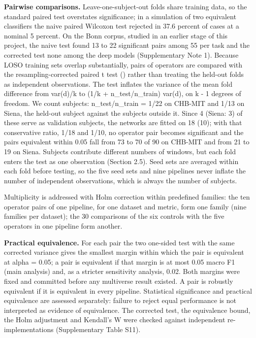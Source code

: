 \documentclass[11pt,a4paper]{article}
\newcounter{none} %
\begin{document}
\textbf{Pairwise comparisons.} Leave-one-subject-out folds share training data, so the
standard paired test overstates significance; in a simulation of two equivalent
classifiers the naive paired Wilcoxon test rejected in 37.6 percent of cases at a
nominal 5 percent. On the Bonn corpus, studied in an
earlier stage of this project, the naive test found 13 to 22 significant pairs among
55 per task and the corrected test none among the deep models (Supplementary Note 1).
Because LOSO training sets overlap substantially, pairs of operators are compared with
the resampling-corrected paired t test (\citealp{Nadeau_2003}) rather than treating
the held-out folds as independent observations. The test inflates the variance of the
mean fold difference from var(d)/k to (1/k + n\_test/n\_train) var(d), on k - 1 degrees
of freedom. We count subjects: n\_test/n\_train = 1/22 on CHB-MIT and 1/13 on Siena, the
held-out subject against the subjects outside it. Since 4 (Siena: 3) of these serve as
validation subjects, the networks are fitted on 18 (10); with that conservative ratio,
1/18 and 1/10, no operator pair becomes significant and the pairs equivalent within
0.05 fall from 73 to 70 of 90 on CHB-MIT and from 21 to 19 on Siena.
Subjects contribute different numbers of
windows, but each fold enters the test as one observation (Section 2.5). Seed sets are
averaged within each fold before testing, so the five seed sets and nine pipelines
never inflate the number of independent observations, which is always the number of
subjects.

Multiplicity is addressed with Holm correction within predefined families: the ten
operator pairs of one pipeline, for one dataset and metric, form one family (nine
families per dataset); the 30 comparisons of the six controls with the five operators
in one pipeline form another.

\textbf{Practical equivalence.} For each pair the two one-sided test with the same
corrected variance gives the smallest margin within which the pair is equivalent at
alpha = 0.05; a pair is equivalent if that margin is at most 0.05 macro F1 (main
analysis) and, as a stricter sensitivity analysis, 0.02. Both margins were fixed and
committed before any multiverse result existed. A pair is robustly equivalent if it is
equivalent in every pipeline. Statistical significance and practical equivalence are
assessed separately: failure to reject equal performance is not interpreted as
evidence of equivalence. The corrected test, the equivalence bound, the Holm
adjustment and Kendall's W were checked against independent re-implementations
(Supplementary Table S11).
\end{document}
